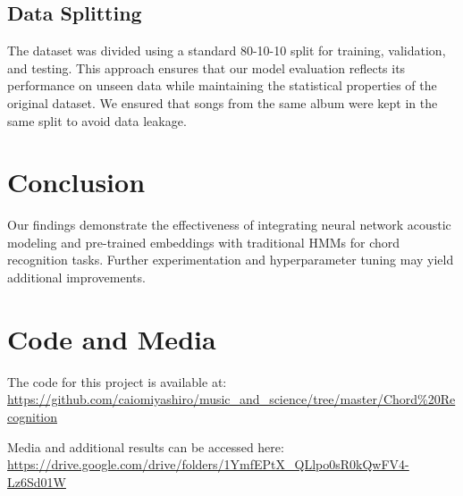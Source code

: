 \documentclass{article}
\begin{document}
\subsection{Data Splitting}
The dataset was divided using a standard 80-10-10 split for training, validation, and testing. 
This approach ensures that our model evaluation reflects its performance on unseen data while 
maintaining the statistical properties of the original dataset. We ensured that songs from the 
same album were kept in the same split to avoid data leakage.

\section{Conclusion}
Our findings demonstrate the effectiveness of integrating neural network acoustic modeling and pre-trained embeddings with traditional HMMs for chord recognition tasks. Further experimentation and hyperparameter tuning may yield additional improvements.

\section*{Code and Media}
The code for this project is available at: \url{https://github.com/caiomiyashiro/music_and_science/tree/master/Chord\%20Recognition}

Media and additional results can be accessed here: \url{https://drive.google.com/drive/folders/1YmfEPtX_QLlpo0sR0kQwFV4-Lz6Sd01W}



\end{document}
